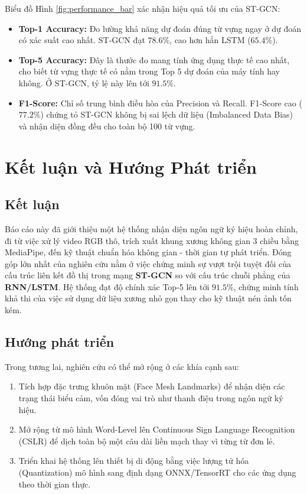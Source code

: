 \documentclass[a4paper,12pt]{report}
\begin{document}
Biểu đồ Hình \ref{fig:performance_bar} xác nhận hiệu quả tối ưu của ST-GCN:
\begin{itemize}
    \item \textbf{Top-1 Accuracy:} Đo lường khả năng dự đoán đúng từ vựng ngay ở dự đoán có xác suất cao nhất. ST-GCN đạt $78.6\%$, cao hơn hẳn LSTM ($65.4\%$).
    \item \textbf{Top-5 Accuracy:} Đây là thước đo mang tính ứng dụng thực tế cao nhất, cho biết từ vựng thực tế có nằm trong Top 5 dự đoán của máy tính hay không. Ở ST-GCN, tỷ lệ này lên tới $91.5\%$.
    \item \textbf{F1-Score:} Chỉ số trung bình điều hòa của Precision và Recall. F1-Score cao ($77.2\%$) chứng tỏ ST-GCN không bị sai lệch dữ liệu (Imbalanced Data Bias) và nhận diện đồng đều cho toàn bộ 100 từ vựng.
\end{itemize}

\chapter{Kết luận và Hướng Phát triển}

\section{Kết luận}
Báo cáo này đã giới thiệu một hệ thống nhận diện ngôn ngữ ký hiệu hoàn chỉnh, đi từ việc xử lý video RGB thô, trích xuất khung xương không gian 3 chiều bằng MediaPipe, đến kỹ thuật chuẩn hóa không gian - thời gian tự phát triển. Đóng góp lớn nhất của nghiên cứu nằm ở việc chứng minh sự vượt trội tuyệt đối của cấu trúc liên kết đồ thị trong mạng \textbf{ST-GCN} so với cấu trúc chuỗi phẳng của \textbf{RNN/LSTM}. Hệ thống đạt độ chính xác Top-5 lên tới $91.5\%$, chứng minh tính khả thi của việc sử dụng dữ liệu xương nhỏ gọn thay cho kỹ thuật nén ảnh tốn kém.

\section{Hướng phát triển}
Trong tương lai, nghiên cứu có thể mở rộng ở các khía cạnh sau:
\begin{enumerate}
    \item Tích hợp đặc trưng khuôn mặt (Face Mesh Landmarks) để nhận diện các trạng thái biểu cảm, vốn đóng vai trò như thanh điệu trong ngôn ngữ ký hiệu.
    \item Mở rộng từ mô hình Word-Level lên Continuous Sign Language Recognition (CSLR) để dịch toàn bộ một câu dài liền mạch thay vì từng từ đơn lẻ.
    \item Triển khai hệ thống lên thiết bị di động bằng việc lượng tử hóa (Quantization) mô hình sang định dạng ONNX/TensorRT cho các ứng dụng theo thời gian thực.
\end{enumerate}
\end{document}
